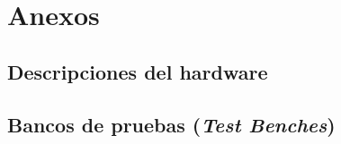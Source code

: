 \section{Anexos}

\subsection{Descripciones del hardware}





\subsection{Bancos de pruebas (\textit{Test Benches})}



